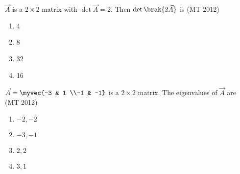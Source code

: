 \item $\vec{A}$ is a $2 \times 2$ matrix with $\det \vec{A} = 2$. Then $\det \brak{2\vec{A}}$ is
\hfill(MT 2012)
\begin{multicols}{4}
\begin{enumerate}  
\item 4
\item 8
\item 32
\item 16
\end{enumerate}
\end{multicols}
%
\item $\vec{A}=\myvec{-3 & 1 \\-1 & -1}$ is a $2 \times 2$ matrix. 
The eigenvalues of $\vec{A}$ are 
\hfill(MT 2012)
\begin{multicols}{4}
\begin{enumerate}  
\item $-2, -2$
\item $-3, -1$
\item $2, 2$
\item $3, 1$
\end{enumerate}
\end{multicols}

